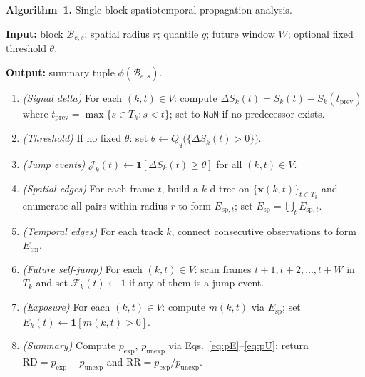 \documentclass[11pt,a4paper]{article}
\theoremstyle{definition}
\theoremstyle{plain}
\newcommand{\sig}[2]{S_{#1}(#2)}
\newcommand{\dS}[2]{\Delta S_{#1}(#2)}
\newcommand{\JE}[2]{\mathcal{J}_{#1}(#2)}
\newcommand{\FJ}[2]{\mathcal{F}_{#1}(#2)}
\newcommand{\expo}[2]{E_{#1}(#2)}
\newcommand{\RD}{\mathrm{RD}}
\newcommand{\RR}{\mathrm{RR}}
\newcommand{\pE}{p_{\mathrm{exp}}}
\newcommand{\pU}{p_{\mathrm{unexp}}}
\newcommand{\1}[1]{\mathbf{1}\!\left[#1\right]}
\begin{document}
\begin{snugshade}
\noindent\textbf{Algorithm~1.} Single-block spatiotemporal propagation analysis.

\medskip
\noindent\textbf{Input:} block $\mathcal{B}_{e,s}$; spatial radius $r$;
  quantile $q$; future window $W$; optional fixed threshold $\theta$.

\noindent\textbf{Output:} summary tuple $\phi(\mathcal{B}_{e,s})$.

\medskip
\begin{enumerate}
  \item \textit{(Signal delta)} For each $(k,t) \in V$:
    compute $\dS{k}{t} = \sig{k}{t} - \sig{k}{t_{\mathrm{prev}}}$
    where $t_{\mathrm{prev}} = \max\{s \in T_k : s < t\}$; set to
    \texttt{NaN} if no predecessor exists.

  \item \textit{(Threshold)} If no fixed $\theta$:
    set $\theta \leftarrow Q_q\!\bigl(\{\dS{k}{t} > 0\}\bigr)$.

  \item \textit{(Jump events)} $\JE{k}{t} \leftarrow \1{\dS{k}{t} \geq \theta}$
    for all $(k,t) \in V$.

  \item \textit{(Spatial edges)} For each frame $t$, build a $k$-d tree on
    $\{\bm{x}(k,t)\}_{t \in T_k}$ and enumerate all pairs within radius $r$
    to form $E_{\mathrm{sp},t}$; set $E_{\mathrm{sp}} = \bigcup_t E_{\mathrm{sp},t}$.

  \item \textit{(Temporal edges)} For each track $k$, connect consecutive
    observations to form $E_{\mathrm{tm}}$.

  \item \textit{(Future self-jump)} For each $(k,t) \in V$:
    scan frames $t+1, t+2, \ldots, t+W$ in $T_k$ and set
    $\FJ{k}{t} \leftarrow 1$ if any of them is a jump event.

  \item \textit{(Exposure)} For each $(k,t) \in V$:
    compute $m(k,t)$ via $E_{\mathrm{sp}}$;
    set $\expo{k}{t} \leftarrow \1{m(k,t)>0}$.

  \item \textit{(Summary)} Compute $\pE$, $\pU$ via
    Eqs.~\eqref{eq:pE}--\eqref{eq:pU};
    return $\RD = \pE - \pU$ and $\RR = \pE/\pU$.
\end{enumerate}
\end{snugshade}

\end{document}
